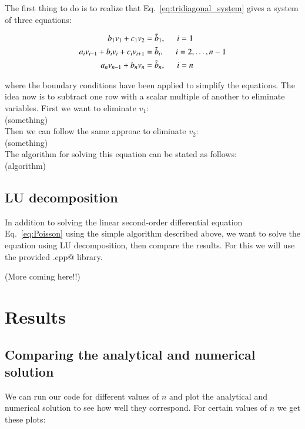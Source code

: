 \documentclass{article}
\begin{document}
\begin{multicols}{2}
The first thing to do is to realize that Eq.~\ref{eq:tridiagonal_system} gives a system of three equations:

\begin{align}
	b_1 v_1 + c_1 v_2 &= \tilde{b}_1, \hspace{0.5cm} i = 1  \\
	a_i v_{i-1} + b_i v_i + c_i v_{i+1} &= \tilde{b}_i, \hspace{0.5cm} i = 2, \dots, n - 1 \\
	a_n v_{n-1} + b_n v_n &= \tilde{b}_n, \hspace{0.5cm} i = n  
\end{align}


\noindent where the boundary conditions have been applied to simplify the equations. The idea now is to subtract one row with a scalar multiple of another to eliminate variables. First we want to eliminate $v_1$:\\

(something)\\

\noindent Then we can follow the same approac to eliminate $v_2$:\\

(something)\\

\noindent The algorithm for solving this equation can be stated as follows:\\

(algorithm)



\subsection{LU decomposition}
In addition to solving the linear second-order differential equation Eq.~\ref{eq:Poisson} using the simple algorithm described above, we want to solve the equation using LU decomposition, then compare the results. For this we will use the provided \verb@lib.cpp@ library.

(More coming here!!)




\section{Results}    \label{sec:analysis}

\subsection{Comparing the analytical and numerical solution}
We can run our code for different values of $n$ and plot the analytical and numerical solution to see how well they correspond. For certain values of $n$ we get these plots:


\end{multicols}
\end{document}

